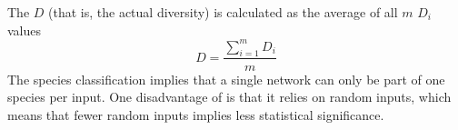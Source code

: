 The \dia{} $D$ (that is, the actual diversity) is calculated as the average of all $m$ $D_i$ values
%
\[D =\frac{\sum_{i=1}^m{D_i}}{m}\]
%
The species classification implies that a single network can only be part of one species per input. One disadvantage of \dia{} is that it relies on random inputs, which means that fewer random inputs implies less statistical significance.
